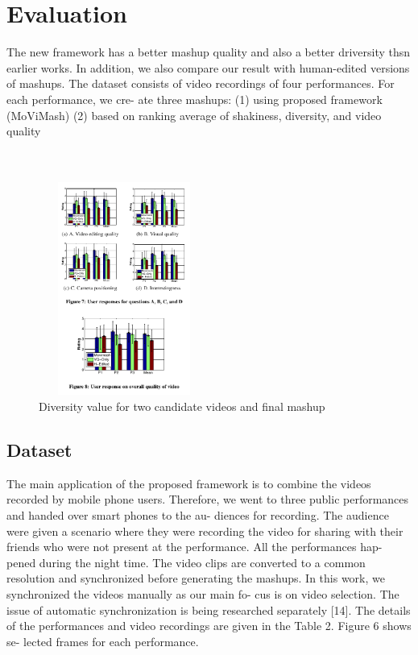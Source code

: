 \documentclass{sig-alternate}
\begin{document}
\section{Evaluation}
The new framework has a better mashup quality and also a better driversity thsn earlier works. In addition, we also compare our result with
human-edited versions of mashups. The dataset consists of video
recordings of four performances. For each performance, we cre-
ate three mashups: (1) using proposed framework (MoViMash) (2)
based on ranking average of shakiness, diversity, and video quality\\ \\ \\

 \begin{figure}[h]
\includegraphics[width=0.5\textwidth ,height = 7cm]{9}
\caption{Diversity value for two candidate videos and ﬁnal mashup}
\label{fig:figure5}
\end{figure}

\subsection{Dataset}
The main application of the proposed framework is to combine
the videos recorded by mobile phone users. Therefore, we went to
three public performances and handed over smart phones to the au-
diences for recording. The audience were given a scenario where
they were recording the video for sharing with their friends who
were not present at the performance. All the performances hap-
pened during the night time. The video clips are converted to a
common resolution and synchronized before generating the mashups.
In this work, we synchronized the videos manually as our main fo-
cus is on video selection. The issue of automatic synchronization is
being researched separately [14]. The details of the performances
and video recordings are given in the Table 2. Figure 6 shows se-
lected frames for each performance.
\end{document}
